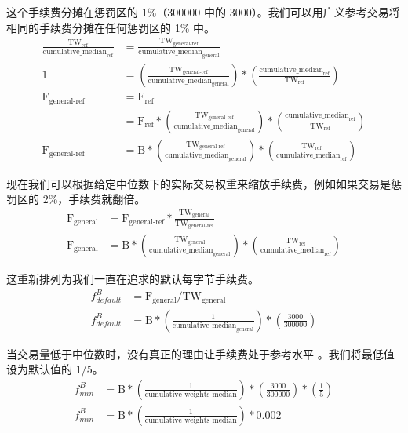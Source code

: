 这个手续费分摊在惩罚区的 1\%（300000 中的 3000）。我们可以用广义参考交易将相同的手续费分摊在任何惩罚区的 1\% 中。\vspace{.175cm}
\begin{align*}
    \frac{\textrm{TW}_{\textrm{ref}}}{\textrm{cumulative\_median}_{\textrm{ref}}} &= \frac{\textrm{TW}_{\textrm{general-ref}}}{\textrm{cumulative\_median}_{\textrm{general}}}\\
    1 &= (\frac{\textrm{TW}_{\textrm{general-ref}}}{\textrm{cumulative\_median}_{\textrm{general}}}) * (\frac{\textrm{cumulative\_median}_{\textrm{ref}}}{\textrm{TW}_{\textrm{ref}}})\\
    \textrm{F}_{\textrm{general-ref}} &= \textrm{F}_{\textrm{ref}}\\
    &= \textrm{F}_{\textrm{ref}}*(\frac{\textrm{TW}_{\textrm{general-ref}}}{\textrm{cumulative\_median}_{\textrm{general}}}) * (\frac{\textrm{cumulative\_median}_{\textrm{ref}}}{\textrm{TW}_{\textrm{ref}}})\\
    \textrm{F}_{\textrm{general-ref}} &= \textrm{B}*(\frac{\textrm{TW}_{\textrm{general-ref}}}{\textrm{cumulative\_median}_{\textrm{general}}}) * (\frac{\textrm{TW}_{\textrm{ref}}}{\textrm{cumulative\_median}_{\textrm{ref}}})
\end{align*}{}

现在我们可以根据给定中位数下的实际交易权重来缩放手续费，例如如果交易是惩罚区的 2\%，手续费就翻倍。\vspace{.175cm}
\begin{align*}
    \textrm{F}_{\textrm{general}} &= \textrm{F}_{\textrm{general-ref}} * \frac{\textrm{TW}_{\textrm{general}}}{\textrm{TW}_{\textrm{general-ref}}}\\
    \textrm{F}_{\textrm{general}} &= \textrm{B}*(\frac{\textrm{TW}_{\textrm{general}}}{\textrm{cumulative\_median}_{\textrm{general}}}) * (\frac{\textrm{TW}_{\textrm{ref}}}{\textrm{cumulative\_median}_{\textrm{ref}}})
\end{align*}{}

这重新排列为我们一直在追求的默认每字节手续费。\vspace{.175cm}
\begin{align*}
    f^{B}_{default} &= \textrm{F}_{\textrm{general}}/\textrm{TW}_{\textrm{general}}\\
    f^{B}_{default} &= \textrm{B}*(\frac{1}{\textrm{cumulative\_median}_{\textrm{general}}}) * (\frac{3000}{300000})
\end{align*}{}

当交易量低于中位数时，没有真正的理由让手续费处于参考水平 \cite{jollymore-old-analysis}。我们将最低值设为默认值的 1/5。\vspace{.175cm}
\begin{align*}
    f^{B}_{min} &= \textrm{B}*(\frac{1}{\textrm{cumulative\_weights\_median}}) * (\frac{3000}{300000}) * (\frac{1}{5})\\
    f^{B}_{min} &= \textrm{B}*(\frac{1}{\textrm{cumulative\_weights\_median}}) * 0.002
\end{align*}{}


